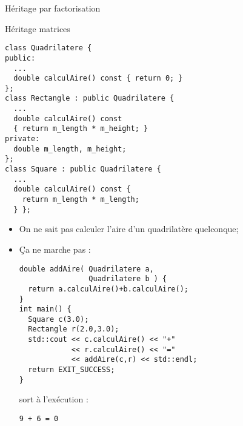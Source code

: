\documentclass[compress,10pt,aspectratio=169]{beamer}
\begin{document}
  \begin{frame}[fragile]{Héritage par factorisation}
  \scriptsize\vspace*{-8mm}
  \begin{exampleblock}{\small Héritage matrices}
  \begin{minipage}{0.48\textwidth}
  \begin{verbatim}
class Quadrilatere {
public:
  ...
  double calculAire() const { return 0; }
};
class Rectangle : public Quadrilatere {
  ...
  double calculAire() const
  { return m_length * m_height; }
private:
  double m_length, m_height;
};
class Square : public Quadrilatere {
  ...
  double calculAire() const {
    return m_length * m_length;
  } };
\end{verbatim}
\end{minipage}\hfill
\begin{minipage}{0.48\textwidth}
  \vspace*{-6mm}
  \begin{itemize}
  \item On ne sait pas calculer l'aire d'un quadrilatère quelconque;
  \item Ça ne marche pas :
  \begin{verbatim}
double addAire( Quadrilatere a, 
                Quadrilatere b ) {
  return a.calculAire()+b.calculAire();
}
int main() {
  Square c(3.0);
  Rectangle r(2.0,3.0);
  std::cout << c.calculAire() << "+" 
            << r.calculAire() << "="
            << addAire(c,r) << std::endl;
  return EXIT_SUCCESS;
}
\end{verbatim}
sort à l'exécution :
\begin{tcolorbox}[colback=black,coltext=white]
\begin{verbatim}
9 + 6 = 0
\end{verbatim}
\end{tcolorbox}
\end{itemize}
\end{minipage}
\end{exampleblock}
  
\end{frame}
  
\end{document}
